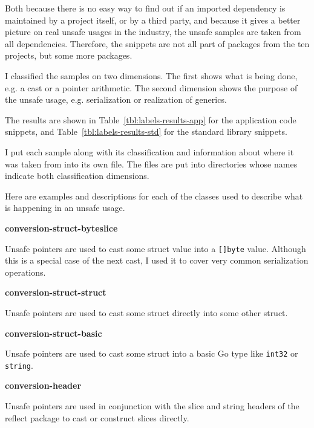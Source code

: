 Both because there is no easy way to find out if an imported dependency is maintained by a project itself, or by a
third party, and because it gives a better picture on real unsafe usages in the industry, the unsafe samples are taken
from all dependencies.
Therefore, the snippets are not all part of packages from the ten projects, but some more packages.

I classified the samples on two dimensions.
The first shows what is being done, e.g. a cast or a pointer arithmetic.
The second dimension shows the purpose of the unsafe usage, e.g. serialization or realization of generics.

The results are shown in Table~\ref{tbl:labels-results-app} for the application code snippets, and
Table~\ref{tbl:labels-results-std} for the standard library snippets.



I put each sample along with its classification and information about where it was taken from into its own file.
The files are put into directories whose names indicate both classification dimensions.

Here are examples and descriptions for each of the classes used to describe what is happening in an unsafe usage.

\textbf{conversion-struct-byteslice}

Unsafe pointers are used to cast some struct value into a \texttt{[]byte} value.
Although this is a special case of the next cast, I used it to cover very common serialization operations.




\textbf{conversion-struct-struct}

Unsafe pointers are used to cast some struct directly into some other struct.




\textbf{conversion-struct-basic}

Unsafe pointers are used to cast some struct into a basic Go type like \texttt{int32} or \texttt{string}.




\textbf{conversion-header}

Unsafe pointers are used in conjunction with the slice and string headers of the reflect package to cast or construct
slices directly.

